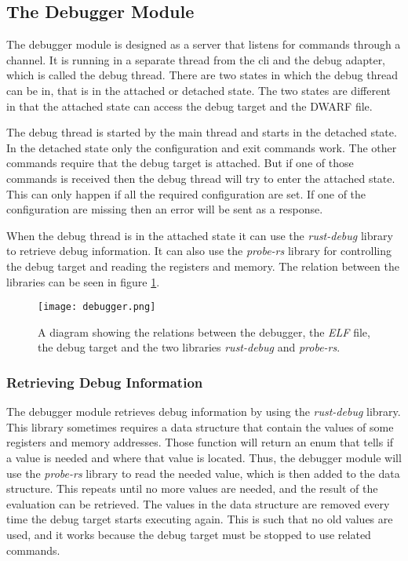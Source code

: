 \subsection{The Debugger Module}
The debugger module is designed as a server that listens for commands through a channel.
It is running in a separate thread from the \acrshort{cli} and the debug adapter, which is called the debug thread.
There are two states in which the debug thread can be in, that is in the attached or detached state.
The two states are different in that the attached state can access the debug target and the \gls{DWARF} file.


The debug thread is started by the main thread and starts in the detached state.
In the detached state only the configuration and exit commands work.
The other commands require that the debug target is attached.
But if one of those commands is received then the debug thread will try to enter the attached state.
This can only happen if all the required configuration are set.
If one of the configuration are missing then an error will be sent as a response.


When the debug thread is in the attached state it can use the \emph{rust-debug} library to retrieve debug information.
It can also use the \emph{probe-rs} library for controlling the debug target and reading the registers and memory.
The relation between the libraries can be seen in figure \ref{fig:debugger}.


\begin{figure}[h]
	\centering
	\texttt{[image: debugger.png]}
	\caption{A diagram showing the relations between the debugger, the \emph{ELF} file, the debug target and the two libraries \emph{rust-debug} and \emph{probe-rs}.}
	\label{fig:debugger}
\end{figure}


\subsubsection{Retrieving Debug Information}
The debugger module retrieves debug information by using the \emph{rust-debug} library.
This library sometimes requires a data structure that contain the values of some registers and memory addresses.
Those function will return an enum that tells if a value is needed and where that value is located.
Thus, the debugger module will use the \emph{probe-rs} library to read the needed value, which is then added to the data structure.
This repeats until no more values are needed, and the result of the evaluation can be retrieved.
The values in the data structure are removed every time the debug target starts executing again.
This is such that no old values are used, and it works because the debug target must be stopped to use related commands.



